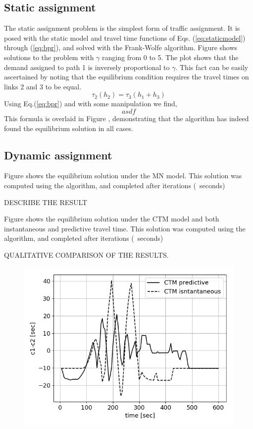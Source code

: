 \subsection{Static assignment}
The static assignment problem is the simplest form of traffic assignment. It is posed with the static model and travel time functions of Eqs. (\ref{eq:staticmodel}) through (\ref{eq:bpr}), and solved with the Frank-Wolfe algorithm. Figure \XXX shows solutions to the problem with $\gamma$ ranging from 0 to 5. The plot shows that the demand assigned to path 1 is inversely proportional to $\gamma$. This fact can be easily ascertained by noting that the equilibrium condition requires the travel times on links 2 and 3 to be equal. 
\begin{equation}
\tau_2(h_2) = \tau_3(h_1 + h_3)
\end{equation}
Using Eq.(\ref{eq:bpr}) and with some manipulation we find,
\begin{equation}
asdf
\end{equation}
This formula is overlaid in Figure \XXX, demonstrating that the algorithm has indeed found the equilibrium solution in all cases. 
 
\subsection{Dynamic assignment}



Figure \XXX shows the equilibrium solution under the MN model. This solution was computed using the \XXX algorithm, and completed after \XXX iterations (~\XXX seconds)

DESCRIBE THE RESULT

Figure \XXX shows the equilibrium solution under the CTM model and both instantaneous and predictive travel time. This solution was computed using the \XXX algorithm, and completed after \XXX iterations (~\XXX seconds)

QUALITATIVE COMPARISON OF THE RESULTS.


\begin{figure}[h]
    \centering
    \includegraphics[width=0.9\linewidth]{figs/cdiff_1300.png}
    \caption{\XXX }
    \label{fig:cdiff}
\end{figure}


